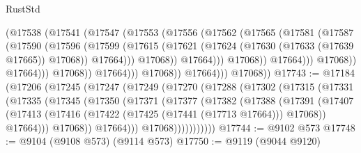 \begin{lexlean}{RustStd}
\begin{coremodule}
                                    (@17538
                                      (@17541
                                        (@17547
                                          (@17553
                                            (@17556
                                              (@17562
                                                (@17565
                                                  (@17581
                                                    (@17587
                                                      (@17590
                                                        (@17596
                                                          (@17599
                                                            (@17615
                                                              (@17621
                                                                (@17624
                                                                  (@17630
                                                                    (@17633 (@17639 @17665))
                                                                    @17068))
                                                                @17664)))
                                                          @17068))
                                                      @17664)))
                                                @17068))
                                            @17664)))
                                      @17068))
                                  @17664)))
                            @17068))
                        @17664)))
                  @17068))
              @17664)))
        @17068))
@17743 := @17184
    (@17206
      (@17245
        (@17247
          (@17249
            (@17270
              (@17288
                (@17302
                  (@17315
                    (@17331
                      (@17335
                        (@17345
                          (@17350
                            (@17371
                              (@17377
                                (@17382
                                  (@17388
                                    (@17391
                                      (@17407
                                        (@17413
                                          (@17416 (@17422 (@17425 (@17441 (@17713 @17664))) @17068))
                                          @17664)))
                                    @17068))
                                @17664)))
                          @17068)))))))))))
@17744 := @9102 @573
@17748 := @9104 (@9108 @573) (@9114 @573)
@17750 := @9119 (@9044 @9120)

\end{coremodule}
\end{lexlean}
